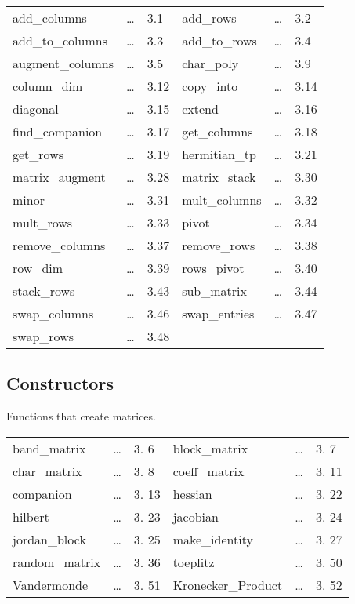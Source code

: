\begin{center}
\begin{tabular}{l l l l l l}
add\_columns     & \ldots & 3.1  &
add\_rows        & \ldots & 3.2  \\
add\_to\_columns & \ldots & 3.3  &
add\_to\_rows    & \ldots & 3.4  \\
augment\_columns & \ldots & 3.5  &
char\_poly       & \ldots & 3.9  \\
column\_dim      & \ldots & 3.12  &
copy\_into       & \ldots & 3.14 \\
diagonal         & \ldots & 3.15 &
extend           & \ldots & 3.16 \\
find\_companion  & \ldots & 3.17  &
get\_columns     & \ldots & 3.18 \\
get\_rows        & \ldots & 3.19 &
hermitian\_tp    & \ldots & 3.21 \\
matrix\_augment  & \ldots & 3.28 &
matrix\_stack    & \ldots & 3.30 \\
minor            & \ldots & 3.31 &
mult\_columns    & \ldots & 3.32 \\
mult\_rows       & \ldots & 3.33 &
pivot            & \ldots & 3.34 \\
remove\_columns  & \ldots & 3.37 &
remove\_rows     & \ldots & 3.38 \\
row\_dim         & \ldots & 3.39 &
rows\_pivot      & \ldots & 3.40 \\
stack\_rows      & \ldots & 3.43 &
sub\_matrix      & \ldots & 3.44 \\
swap\_columns    & \ldots & 3.46 &
swap\_entries    & \ldots & 3.47 \\
swap\_rows       & \ldots & 3.48 &
\end{tabular}
\end{center}

\subsection{Constructors}

Functions that create matrices.

\begin{center}
\begin{tabular}{l l l l l l}
band\_matrix       & \ldots & 3. 6 &
block\_matrix      & \ldots & 3. 7 \\
char\_matrix       & \ldots & 3. 8 &
coeff\_matrix      & \ldots & 3. 11 \\
companion          & \ldots & 3. 13 &
hessian            & \ldots & 3. 22 \\
hilbert            & \ldots & 3. 23 &
jacobian           & \ldots & 3. 24 \\
jordan\_block      & \ldots & 3. 25 &
make\_identity     & \ldots & 3. 27 \\
random\_matrix     & \ldots & 3. 36 &
toeplitz           & \ldots & 3. 50 \\
Vandermonde        & \ldots & 3. 51 &
Kronecker\_Product & \ldots & 3. 52
\end{tabular}
\end{center}


